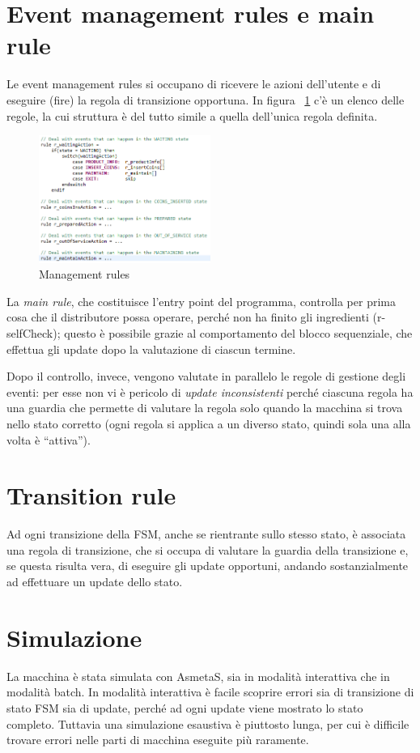 \section{Event management rules e main rule}
Le event management rules si occupano di ricevere le azioni dell’utente e di eseguire (fire) la regola di transizione opportuna. In figura ~\ref{fig:managementRules} c’è un elenco delle regole, la cui struttura è del tutto simile a quella dell’unica regola definita. 

\begin{figure}[h]
	\centering
	\includegraphics[width=0.5\textwidth]{Immagini/ManagementRule.png}
	\caption{Management rules}
	\label{fig:managementRules}
\end{figure}

La \textit{main rule}, che costituisce l’entry point del programma, controlla per prima cosa che il distributore possa operare, perché non ha finito gli ingredienti (r-selfCheck); questo è possibile grazie al comportamento del blocco sequenziale, che effettua gli update dopo la valutazione di ciascun termine. 

Dopo il controllo, invece, vengono valutate in parallelo le regole di gestione degli eventi: per esse non vi è pericolo di \textit{update inconsistenti} perché ciascuna regola ha una guardia che permette di valutare la regola solo quando la macchina si trova nello stato corretto (ogni regola si applica a un diverso stato, quindi sola una alla volta è “attiva”).

\section{Transition rule}
Ad ogni transizione della FSM, anche se rientrante sullo stesso stato, è associata una regola di transizione, che si occupa di valutare la guardia della transizione e, se questa risulta vera, di eseguire gli update opportuni, andando sostanzialmente ad effettuare un update dello stato.


\section{Simulazione}
La macchina è stata simulata con AsmetaS, sia in modalità interattiva che in modalità batch.
In modalità interattiva è facile scoprire errori sia di transizione di stato FSM sia di update, perché ad ogni update viene mostrato lo stato completo. Tuttavia una simulazione esaustiva è piuttosto lunga, per cui è difficile trovare errori nelle parti di macchina eseguite più raramente.

